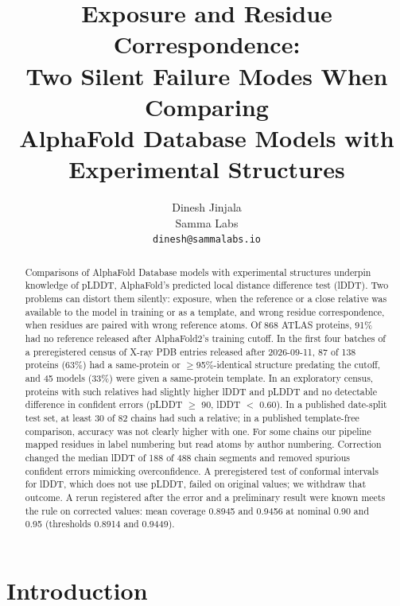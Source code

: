 \documentclass{article}
\title{Exposure and Residue Correspondence:\\
Two Silent Failure Modes When Comparing\\
AlphaFold Database Models with Experimental Structures}
\author{Dinesh Jinjala\\
Samma Labs\\
\texttt{dinesh@sammalabs.io}
}
\begin{document}
\maketitle

\begin{abstract}
Comparisons of AlphaFold Database models with experimental structures underpin
knowledge of pLDDT, AlphaFold's predicted local distance difference test
(lDDT). Two problems can distort them silently: exposure, when the reference
or a close relative was available to the model in training or as a template,
and wrong residue correspondence, when residues are paired with wrong
reference atoms. Of 868 ATLAS proteins, 91\% had no reference released after
AlphaFold2's training cutoff. In the first four batches of a preregistered
census of X-ray PDB entries released after 2026-09-11, 87 of 138 proteins
(63\%) had a same-protein or $\ge$95\%-identical structure predating the
cutoff, and 45 models (33\%) were given a same-protein template. In an
exploratory census, proteins with such relatives had slightly higher lDDT and
pLDDT and no detectable difference in confident errors (pLDDT $\ge$ 90, lDDT
$<$ 0.60). In a published date-split test set, at least 30 of 82 chains had
such a relative; in a published template-free comparison, accuracy was not
clearly higher with one. For some chains our pipeline mapped residues in label
numbering but read atoms by author numbering. Correction changed the median
lDDT of 188 of 488 chain segments and removed spurious confident errors
mimicking overconfidence. A preregistered test of conformal intervals for
lDDT, which does not use pLDDT, failed on original values; we withdraw that
outcome. A rerun registered after the error and a preliminary result were
known meets the rule on corrected values: mean coverage 0.8945 and 0.9456 at
nominal 0.90 and 0.95 (thresholds 0.8914 and 0.9449).
\end{abstract}

\section{Introduction}
\label{sec:intro}
\end{document}
